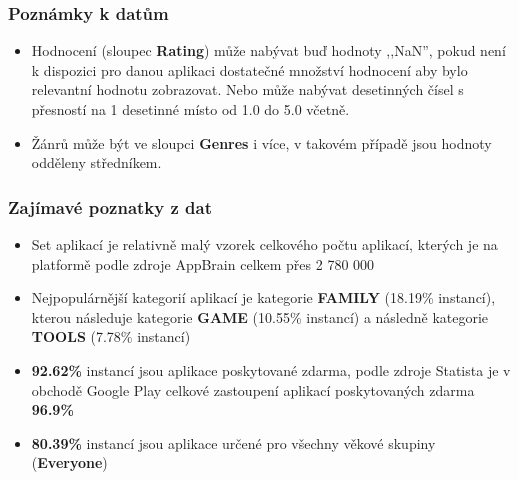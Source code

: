 \documentclass{article}
\begin{document}
\subsubsection*{Poznámky k datům}
\begin{itemize}
    \item Hodnocení (sloupec \textbf{Rating}) může nabývat buď hodnoty ,,NaN'', pokud není k dispozici pro danou aplikaci dostatečné
    množství hodnocení aby bylo relevantní hodnotu zobrazovat. Nebo může nabývat desetinných čísel s přesností na 1 desetinné místo 
    od 1.0 do 5.0 včetně.
    
    \item Žánrů může být ve sloupci \textbf{Genres} i více, v takovém případě jsou hodnoty odděleny středníkem.
\end{itemize}

\subsubsection*{Zajímavé poznatky z dat}
\begin{itemize}
    \item Set aplikací je relativně malý vzorek celkového počtu aplikací, kterých je na platformě 
    podle zdroje AppBrain celkem přes 2 780 000 \cite{appbrain_number_of_apps_google_play}
    
    \item Nejpopulárnější kategorií aplikací je kategorie \textbf{FAMILY} (18.19\% instancí), 
        kterou následuje kategorie \textbf{GAME} (10.55\% instancí) a následně kategorie \textbf{TOOLS} 
        (7.78\% instancí)
        
    \begin{bchart}[max=2000, step=200, width=\linewidth]
         \smallskip
         \smallskip
         \smallskip
         \smallskip
         \smallskip
         \smallskip
         \smallskip
         \smallskip
         \smallskip
    \end{bchart}
        
    \item \textbf{92.62\%} instancí jsou aplikace poskytované zdarma, 
    podle zdroje Statista je v obchodě Google Play celkové zastoupení aplikací poskytovaných zdarma \textbf{96.9\%} \cite{statista_free_paid_apps}
    
    \item \textbf{80.39\%} instancí jsou aplikace určené pro všechny věkové skupiny (\textbf{Everyone})
\end{itemize}
\end{document}

